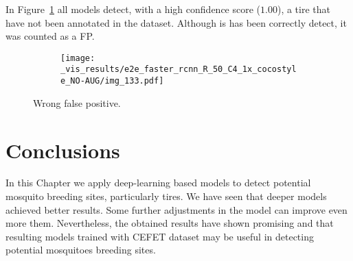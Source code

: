 In Figure~\ref{fig:wrong_fp} all models detect, with a high confidence score ($1.00$), a tire that have not been annotated in the dataset.
Although is has been correctly detect, it was counted as a FP.

\begin{figure}[th!]
  \centering
  \begin{subfigure}[t]{\linewidth}
    \centering
    \texttt{[image: \_vis\_results/e2e\_faster\_rcnn\_R\_50\_C4\_1x\_cocostyle\_NO-AUG/img\_133.pdf]}
  \end{subfigure}%
  \caption{Wrong false positive.}
  \label{fig:wrong_fp}
\end{figure}


\section{Conclusions}
%
In this Chapter we apply deep-learning based models to detect potential mosquito breeding sites, particularly tires.
We have seen that deeper models achieved better results.
Some further adjustments in the model can improve even more them.
Nevertheless, the obtained results have shown promising and that resulting models trained with CEFET dataset may be useful in detecting potential mosquitoes breeding sites.










